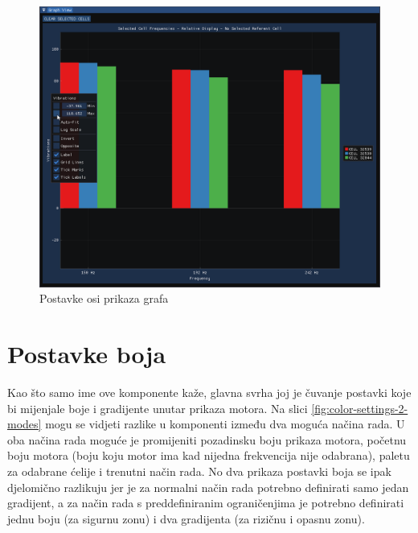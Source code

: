 \documentclass[times, utf8, diplomski]{fer}
\begin{document}
\begin{figure} [H]
	\centering
    \includegraphics[width=\textwidth]{graph_view_axis_settings.png}
    \caption{Postavke osi prikaza grafa}
    \label{fig:graph-axis-settings}
\end{figure}

\section{Postavke boja} \label{color-settings-section}
Kao što samo ime ove komponente kaže, glavna svrha joj je čuvanje postavki koje bi mijenjale boje i gradijente unutar prikaza motora. Na slici \ref{fig:color-settings-2-modes} mogu se vidjeti razlike u komponenti između dva moguća načina rada. U oba načina rada moguće je promijeniti pozadinsku boju prikaza motora, početnu boju motora (boju koju motor ima kad nijedna frekvencija nije odabrana), paletu za odabrane ćelije i trenutni način rada. No dva prikaza postavki boja se ipak djelomično razlikuju jer je za normalni način rada potrebno definirati samo jedan gradijent, a za način rada s preddefiniranim ograničenjima je potrebno definirati jednu boju (za sigurnu zonu) i dva gradijenta (za rizičnu i opasnu zonu).
\end{document}
